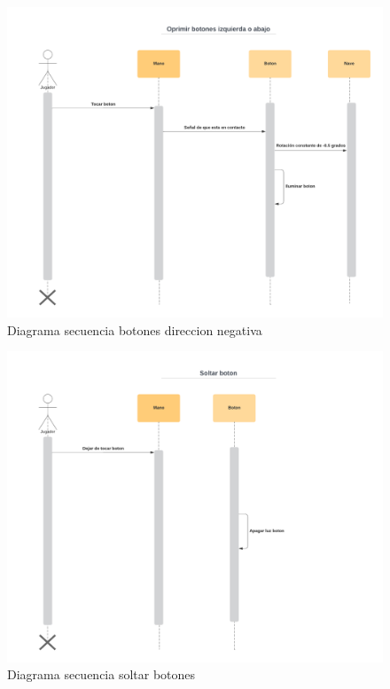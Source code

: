 \documentclass[12pt]{article} %
\begin{document}
\begin{figure}  [!htb]
  \includegraphics[width=\linewidth]{Diagrama secuencia oprimir botones 2.png}
  \caption{Diagrama secuencia botones direccion negativa}
\end{figure}

\begin{figure}  [!htb]
  \includegraphics[width=\linewidth]{Diagrama secuencia soltar boton.png}
  \caption{Diagrama secuencia soltar botones}
\end{figure}
\end{document}
